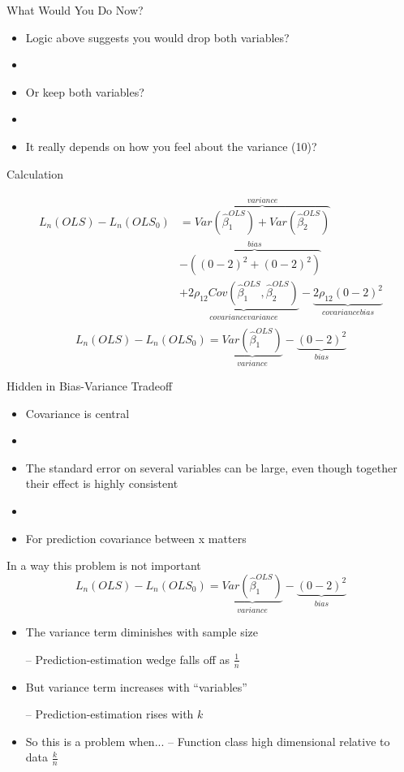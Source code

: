 \documentclass{beamer}
\begin{document}
\begin{frame}{What Would You Do Now?}
	\begin{itemize}
		\item Logic above suggests you would drop both variables?		
		\item[]
		\item Or keep both variables?		
		\item[]
		\item It really depends on how you feel about the variance (10)?
	\end{itemize}
\end{frame}

\begin{frame}{Calculation}
	
	\begin{align*}
		 L_n(OLS)-L_n(OLS_0)&=\overbrace{Var(\hat{\beta}_1^{OLS})+Var(\hat{\beta}_2^{OLS})}^{variance}\\
		&-\overbrace{((0-2)^2+(0-2)^2)}^{bias}\\	
		&+\underbrace{2\rho_{12}Cov(\hat{\beta}_1^{OLS},\hat{\beta}_2^{OLS})}_{covariance variance}-\underbrace{2\rho_{12}(0-2)^2}_{covariance bias}\\	
	\end{align*}
		$$L_n(OLS)-L_n(OLS_0)=\underbrace{Var(\hat{\beta}_1^{OLS})}_{variance}-\underbrace{(0-2)^2}_{bias}$$
\end{frame}

\begin{frame}{Hidden in Bias-Variance Tradeoff}
	\begin{itemize}
		\item Covariance is central
		\item[]
		\item The standard error on several variables can be large, even though together their effect is highly consistent
		\item[]
		\item For prediction covariance between x matters
	\end{itemize}
\end{frame}

\begin{frame}{In a way this problem is not important}
	$$L_n(OLS)-L_n(OLS_0)=\underbrace{Var(\hat{\beta}_1^{OLS})}_{variance}-\underbrace{(0-2)^2}_{bias}$$
	\begin{itemize}
		\item The variance term diminishes with sample size
		
		– Prediction-estimation wedge falls off as $\frac{1}{n}$
		\item But variance term increases with “variables”
		
		– Prediction-estimation rises with $k$
		
		\item So this is a problem when...
		– Function class high dimensional relative to data $\frac{k}{n}$
	\end{itemize}
\end{frame}
\end{document}
